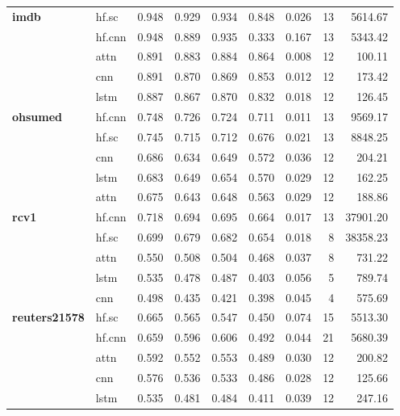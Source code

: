 \documentclass[final]{clv2025}
\begin{document}
\begin{table}[h!]
\begin{tabular}{@{}p{2cm}p{1.2cm}rrrrrrr@{}}
\midrule
\textbf{imdb} & hf.sc & 0.948 & 0.929 & 0.934 & 0.848 & 0.026 & 13 & 5614.67 \\
 & hf.cnn & 0.948 & 0.889 & 0.935 & 0.333 & 0.167 & 13 & 5343.42 \\
 & attn & 0.891 & 0.883 & 0.884 & 0.864 & 0.008 & 12 & 100.11 \\
 & cnn & 0.891 & 0.870 & 0.869 & 0.853 & 0.012 & 12 & 173.42 \\
 & lstm & 0.887 & 0.867 & 0.870 & 0.832 & 0.018 & 12 & 126.45 \\
\midrule
\textbf{ohsumed} & hf.cnn & 0.748 & 0.726 & 0.724 & 0.711 & 0.011 & 13 & 9569.17 \\
 & hf.sc & 0.745 & 0.715 & 0.712 & 0.676 & 0.021 & 13 & 8848.25 \\
 & cnn & 0.686 & 0.634 & 0.649 & 0.572 & 0.036 & 12 & 204.21 \\
 & lstm & 0.683 & 0.649 & 0.654 & 0.570 & 0.029 & 12 & 162.25 \\
 & attn & 0.675 & 0.643 & 0.648 & 0.563 & 0.029 & 12 & 188.86 \\
\midrule
\textbf{rcv1} & hf.cnn & 0.718 & 0.694 & 0.695 & 0.664 & 0.017 & 13 & 37901.20 \\
 & hf.sc & 0.699 & 0.679 & 0.682 & 0.654 & 0.018 & 8 & 38358.23 \\
 & attn & 0.550 & 0.508 & 0.504 & 0.468 & 0.037 & 8 & 731.22 \\
 & lstm & 0.535 & 0.478 & 0.487 & 0.403 & 0.056 & 5 & 789.74 \\
 & cnn & 0.498 & 0.435 & 0.421 & 0.398 & 0.045 & 4 & 575.69 \\
\midrule
\textbf{reuters21578} & hf.sc & 0.665 & 0.565 & 0.547 & 0.450 & 0.074 & 15 & 5513.30 \\
 & hf.cnn & 0.659 & 0.596 & 0.606 & 0.492 & 0.044 & 21 & 5680.39 \\
 & attn & 0.592 & 0.552 & 0.553 & 0.489 & 0.030 & 12 & 200.82 \\
 & cnn & 0.576 & 0.536 & 0.533 & 0.486 & 0.028 & 12 & 125.66 \\
 & lstm & 0.535 & 0.481 & 0.484 & 0.411 & 0.039 & 12 & 247.16 \\
\bottomrule
\end{tabular}
\end{table}
\end{document}

